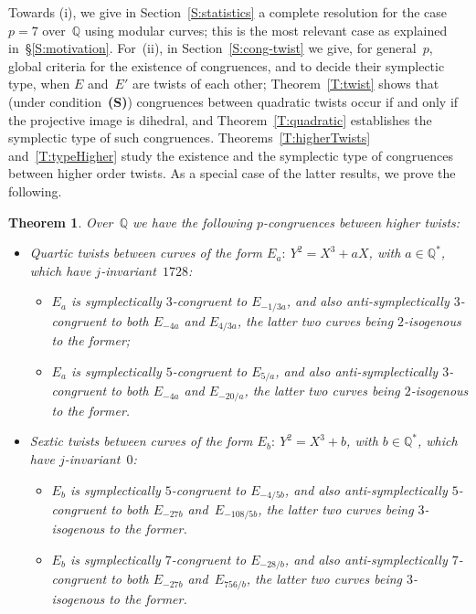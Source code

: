 \documentclass[12pt, reqno]{amsart}
\newcommand{\Q}{\mathbb{Q}}
\numberwithin{equation}{section}
\newtheorem{theorem}{Theorem}[section]
\theoremstyle{definition}
\theoremstyle{remark}
\begin{document}
Towards (i), we give in Section~\ref{S:statistics} a complete
resolution for the case~$p=7$ over~$\Q$ using modular curves; this is the most relevant case as explained in~\S\ref{S:motivation}.
For~(ii), in
Section~\ref{S:cong-twist} we give, for general~$p$, global criteria
for the existence of congruences, and to decide their symplectic type, when $E$
and~$E'$ are twists of each other; Theorem~\ref{T:twist} shows that
(under condition~{\bf(S)}) congruences between quadratic twists occur if
and only if the projective image is dihedral, and
Theorem~\ref{T:quadratic} establishes the symplectic type of such
congruences. Theorems~\ref{T:higherTwists} and~\ref{T:typeHigher}
study the existence and the symplectic type of congruences between
higher order twists.  As a special case of the latter results, we prove
the following.

\begin{theorem}
\label{T:higherTwistsQ}
Over~$\Q$ we have the following 
$p$-congruences between higher twists:
\begin{itemize}
\item Quartic twists between curves of the form $E_a:\ Y^2=X^3+aX$,
  with $a \in \Q^*$, which have $j$-invariant~$1728$:
  \begin{itemize}
    \item
   $E_a$ is symplectically $3$-congruent to $E_{-1/3a}$, and also
      anti-symplectically $3$-congruent to both $E_{-4a}$ and
      $E_{4/3a}$, the latter two curves being $2$-isogenous to the
      former;
    \item
      $E_a$ is symplectically $5$-congruent to $E_{5/a}$, and also
      anti-symplectically $3$-congruent to both $E_{-4a}$ and
      $E_{-20/a}$, the latter two curves being $2$-isogenous to the
      former.
  \end{itemize}
\item Sextic twists between curves of the form $E_b:\ Y^2=X^3+b$, with
  $b \in \Q^*$, which have $j$-invariant~$0$:
  \begin{itemize}
    \item
      $E_b$ is symplectically $5$-congruent to $E_{-4/5b}$, and also
      anti-symplectically $5$-congruent to both $E_{-27b}$
      and~$E_{-108/5b}$, the latter two curves being $3$-isogenous to
      the former.
    \item
      $E_b$ is symplectically $7$-congruent to $E_{-28/b}$, and also
      anti-symplectically $7$-congruent to both $E_{-27b}$
      and~$E_{756/b}$, the latter two curves being $3$-isogenous to
      the former.
  \end{itemize}
\end{itemize}
\end{theorem}
\end{document}
